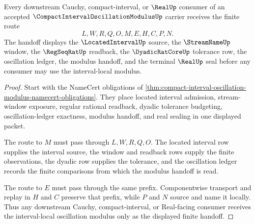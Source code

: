 \begin{theorem}
\label{thm:compact-interval-oscillation-modulus-handoff}
Every downstream Cauchy, compact-interval, or $\RealUp$ consumer of an accepted $\CompactIntervalOscillationModulusUp$ carrier receives the finite route
$$
L,W,R,Q,O,M,E,H,C,P,N .
$$
The handoff displays the $\LocatedIntervalUp$ source, the $\StreamNameUp$ window, the $\RegSeqRatUp$ readback, the $\DyadicRatCoreUp$ tolerance row, the oscillation ledger, the modulus handoff, and the terminal $\RealUp$ seal before any consumer may use the interval-local modulus.
\end{theorem}
\begin{proof}
Start with the NameCert obligations of \autoref{thm:compact-interval-oscillation-modulus-namecert-obligations}. They place located interval admission, stream-window exposure, regular rational readback, dyadic tolerance budgeting, oscillation-ledger exactness, modulus handoff, and real sealing in one displayed packet.

The route to $M$ must pass through $L,W,R,Q,O$. The located interval row supplies the interval source, the window and readback rows supply the finite observations, the dyadic row supplies the tolerance, and the oscillation ledger records the finite comparisons from which the modulus handoff is read.

The route to $E$ must pass through the same prefix. Componentwise transport and replay in $H$ and $C$ preserve that prefix, while $P$ and $N$ source and name it locally. Thus any downstream Cauchy, compact-interval, or Real-facing consumer receives the interval-local oscillation modulus only as the displayed finite handoff.
\end{proof}




